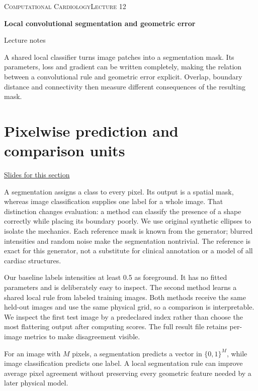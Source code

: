 \documentclass[11pt,letterpaper]{article}
\theoremstyle{definition}\newtheorem{definition}{Definition}\newtheorem{example}{Example}
\numberwithin{equation}{section}
\begin{document}
{\small\scshape Computational Cardiology\hfill Lecture 12}\par\medskip
{\raggedright{}\LARGE\bfseries\color{ink} Local convolutional segmentation and geometric error\par}\medskip
{\small Lecture notes}\par\bigskip
A shared local classifier turns image patches into a segmentation mask. Its parameters, loss and gradient can be written completely, making the relation between a convolutional rule and geometric error explicit. Overlap, boundary distance and connectivity then measure different consequences of the resulting mask.

\section{Pixelwise prediction and comparison units}
\hypertarget{note-pixelwise-prediction-and-comparison-units}{}\label{note:pixelwise-prediction-and-comparison-units}
{\small \href{slides.html\#frame=the-output-of-segmentation\&step=1}{Slides for this section}}\par
A segmentation assigns a class to every pixel. Its output is a spatial mask, whereas image classification supplies one label for a whole image. That distinction changes evaluation: a method can classify the presence of a shape correctly while placing its boundary poorly. We use original synthetic ellipses to isolate the mechanics. Each reference mask is known from the generator; blurred intensities and random noise make the segmentation nontrivial. The reference is exact for this generator, not a substitute for clinical annotation or a model of all cardiac structures.

Our baseline labels intensities at least 0.5 as foreground. It has no fitted parameters and is deliberately easy to inspect. The second method learns a shared local rule from labeled training images. Both methods receive the same held-out images and use the same physical grid, so a comparison is interpretable. We inspect the first test image by a predeclared index rather than choose the most flattering output after computing scores. The full result file retains per-image metrics to make disagreement visible.

For an image with $M$ pixels, a segmentation predicts a vector in $\{0,1\}^M$, while image classification predicts one label. A local segmentation rule can improve average pixel agreement without preserving every geometric feature needed by a later physical model.
\end{document}
